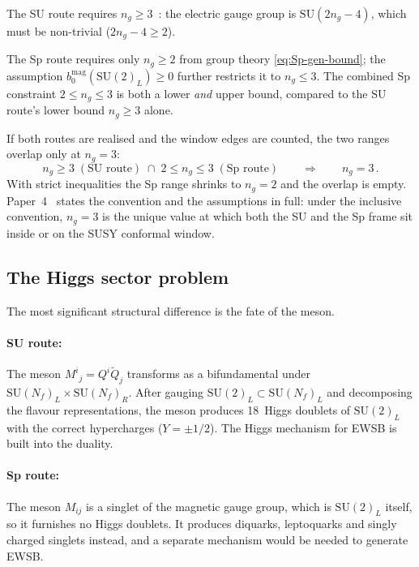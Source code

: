\documentclass[11pt,a4paper]{article}
\theoremstyle{plain}
\theoremstyle{definition}
\theoremstyle{remark}
\newcommand{\Nf}{N_{\!f}}
\newcommand{\SU}[1]{\mathrm{SU}(#1)}
\begin{document}
The SU route requires
$n_g \geq 3$~\cite{Sannino2011,CacciapagliaSannino2024}:
the electric gauge group is $\SU{2n_g - 4}$, which must be
non-trivial ($2n_g - 4 \geq 2$).

The Sp route requires only $n_g \geq 2$ from group theory
\eqref{eq:Sp-gen-bound}; the assumption
$b_0^{\mathrm{mag}}(\SU{2}_L) \geq 0$ further restricts it to
$n_g \leq 3$.  The combined Sp constraint $2 \leq n_g \leq 3$ is both a
lower \emph{and} upper bound, compared to the SU route's lower bound
$n_g \geq 3$ alone.

If both routes are realised and the window edges are counted, the two
ranges overlap only at $n_g = 3$:
\begin{equation}\label{eq:ng3-unique}
  n_g \geq 3 \;(\text{SU route}) \;\cap\;
  2 \leq n_g \leq 3 \;(\text{Sp route})
  \qquad\Longrightarrow\qquad
  \boxed{n_g = 3}\,.
\end{equation}
With strict inequalities the Sp range shrinks to $n_g = 2$ and the
overlap is empty.  Paper~4~\cite{Paper4} states the convention and the
assumptions in full: under the inclusive convention, $n_g = 3$ is the
unique value at which both the SU and the Sp frame sit inside or on the
SUSY conformal window.

\subsection{The Higgs sector problem}

The most significant structural difference is the fate of the meson.

\paragraph{SU route:}
The meson $M^i{}_j = Q^i\widetilde{Q}_j$ transforms as a
bifundamental under $\SU{\Nf}_L \times \SU{\Nf}_R$.  After gauging
$\SU{2}_L \subset \SU{\Nf}_L$ and decomposing the flavour
representations, the meson produces 18~Higgs doublets of $\SU{2}_L$
with the correct hypercharges ($Y = \pm 1/2$).  The Higgs
mechanism for EWSB is built into the duality.

\paragraph{Sp route:}
The meson $M_{ij}$ is a singlet of the magnetic gauge group, which is
$\SU{2}_L$ itself, so it furnishes no Higgs doublets.  It produces
diquarks, leptoquarks and singly charged singlets instead, and a
separate mechanism would be needed to generate EWSB.
\end{document}
